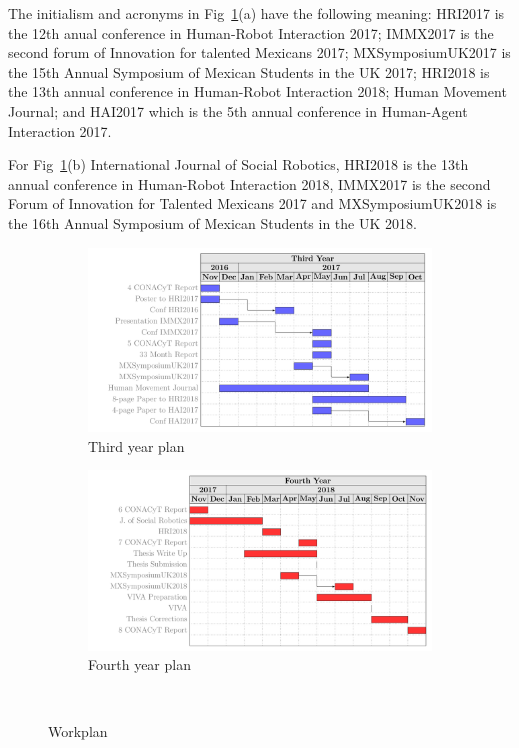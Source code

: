 \documentclass{sigchi}
\begin{document}
The initialism and acronyms in Fig~\ref{fig:workplan}(a) have the following meaning:
HRI2017 is the 12th anual conference in Human-Robot Interaction 2017;
IMMX2017 is the second forum of Innovation for talented Mexicans 2017;
MXSymposiumUK2017 is the 15th Annual Symposium of Mexican Students in the UK 2017;
HRI2018 is the 13th annual conference in Human-Robot Interaction 2018;
Human Movement Journal;
and HAI2017 which is the 5th annual conference in Human-Agent Interaction 2017.

For Fig~\ref{fig:workplan}(b)
International Journal of Social Robotics,
HRI2018 is the 13th annual conference in Human-Robot Interaction 2018,
IMMX2017 is the second Forum of Innovation for Talented Mexicans 2017
and
MXSymposiumUK2018 is the 16th Annual Symposium of Mexican Students in the UK 2018.


\begin{figure}
\centering
  \begin{subfigure}[b]{0.5\textwidth}
  \includegraphics[width=0.9\columnwidth]{figures/third_year_b}
  \caption{Third year plan}
  \end{subfigure}\qquad

  \begin{subfigure}[b]{0.5\textwidth}
  \includegraphics[width=0.9\columnwidth]{figures/fourth_year_b}
  \caption{Fourth year plan}
  \end{subfigure}\qquad

  \caption{Workplan}~\label{fig:workplan}
\end{figure}
\end{document}
